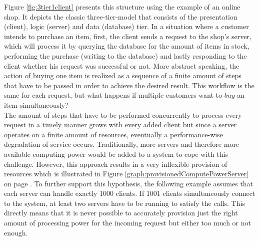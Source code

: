 Figure \ref{fig:3tier1client} presents this structure using the example of an online shop. It depicts the classic three-tier-model that consists of the presentation (client), logic (server) and data (database) tier.\autocite{Ramirez2000Three-TierArchitecture} In a situation where a customer intends to purchase an item, first, the client sends a request to the shop's server, which will process it by querying the database for the amount of items in stock, performing the purchase (writing to the database) and lastly responding to the client whether his request was successful or not. More abstract speaking, the action of buying one item is realized as a sequence of a finite amount of steps that have to be passed in order to achieve the desired result. This workflow is the same for each request, but what happens if multiple customers want to $buy$ an item simultaneously? \\
The amount of steps that have to be performed concurrently to process every request in a timely manner grows with every added client but since a server operates on a finite amount of resources, eventually a performance-wise degradation of service occurs. Traditionally, more servers and therefore more available computing power would be added to a system to cope with this challenge. However, this approach results in a very inflexible provision of resources which is illustrated in Figure \ref{graph:provisionedComputePowerServer} on page \pageref{graph:provisionedComputePowerServer}. To further support this hypothesis, the following example assumes that each server can handle exactly 1000 clients. If 1001 clients simultaneously connect to the system, at least two servers have to be running to satisfy the calls. This directly means that it is never possible to accurately provision just the right amount of processing power for the incoming request but either too much or not enough. 

